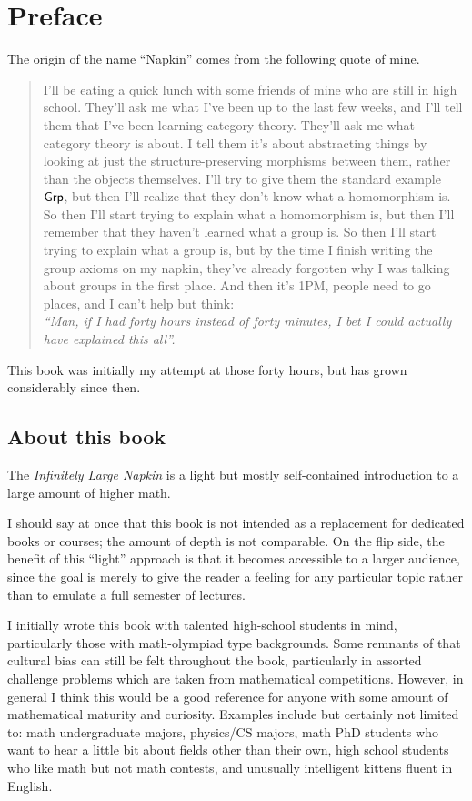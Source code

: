 \chapter{Preface}
The origin of the name ``Napkin''
comes from the following quote of mine.
\begin{quote}
\small
I'll be eating a quick lunch with some friends of mine
who are still in high school.
They'll ask me what I've been up to the last few weeks,
and I'll tell them that I've been learning category theory.
They'll ask me what category theory is about.
I tell them it's about abstracting things by looking at just the
structure-preserving morphisms between them, rather than the objects themselves.
I'll try to give them the standard example $\mathsf{Grp}$,
but then I'll realize that they don't know what a homomorphism is.
So then I'll start trying to explain what a homomorphism is,
but then I'll remember that they haven't learned what a group is.
So then I'll start trying to explain what a group is,
but by the time I finish writing the group axioms on my napkin,
they've already forgotten why I was talking about groups in the first place.
And then it's 1PM, people need to go places, and I can't help but think: \\[0.5ex]
\emph{``Man, if I had forty hours instead of forty minutes,
I bet I could actually have explained this all''.}
\end{quote}
This book was initially my attempt at those forty hours,
but has grown considerably since then.

\section*{About this book}
The \emph{Infinitely Large Napkin} is a light
but mostly self-contained introduction to a large
amount of higher math.

I should say at once that this book is not intended
as a replacement for dedicated books or courses;
the amount of depth is not comparable.
On the flip side, the benefit of this ``light'' approach
is that it becomes accessible to a larger audience,
since the goal is merely to give the reader a feeling for
any particular topic rather than to emulate a full semester of lectures.

I initially wrote this book with talented high-school students in mind,
particularly those with math-olympiad type backgrounds.
Some remnants of that cultural bias can still be felt throughout the book,
particularly in assorted challenge problems which are
taken from mathematical competitions.
However, in general I think this would be a good reference
for anyone with some amount of mathematical maturity and curiosity.
Examples include but certainly not limited to:
math undergraduate majors, physics/CS majors,
math PhD students who want to hear a little bit about fields other than their own,
high school students who like math but not math contests,
and unusually intelligent kittens fluent in English.


